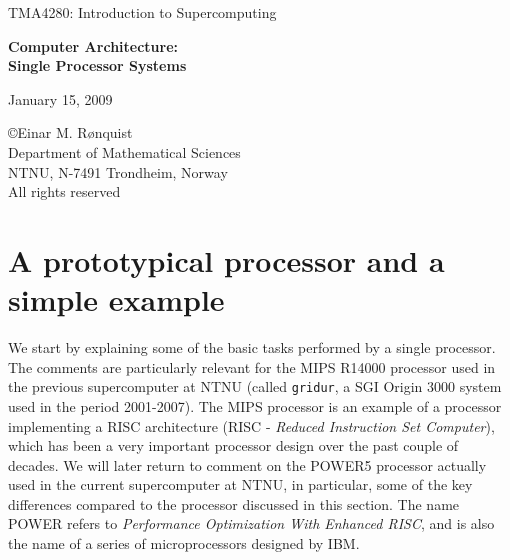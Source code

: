 \documentclass[11pt]{article}
\begin{document}
 
\LARGE
\begin{center}
TMA4280: Introduction to Supercomputing
\end{center}
\vspace{1in}

\begin{center}
{\bf Computer Architecture: \\ Single Processor Systems}
\end{center}

\Large
\vspace{0.5in}
\begin{center}
January 15, 2009
\end{center}

\vspace{0.5in}

\begin{center}
\copyright Einar M. R{\o}nquist \\
Department of Mathematical Sciences\\
NTNU, N-7491 Trondheim, Norway\\
All rights reserved
\end{center}

\large

\newpage

\section{A prototypical processor and a simple example}

We start by explaining some of the basic tasks performed by a single processor. 
The comments are particularly relevant for the MIPS R14000 processor 
used in the previous supercomputer at NTNU
(called \texttt{gridur}, a SGI Origin 3000 system used in the period 2001-2007). 
The MIPS processor is an example of a processor implementing a 
RISC architecture
(RISC - {\em Reduced Instruction Set Computer}), 
which has been a very important 
processor design over the past couple of decades. 
We will later return to comment on the  
POWER5 processor actually used in the current supercomputer at NTNU, 
in particular, some of the key differences compared to the processor discussed 
in this section. The name POWER refers to {\em Performance Optimization 
With Enhanced RISC}, and is also the name of a series of microprocessors designed 
by IBM.

\vspace{2cm}
\end{document}
